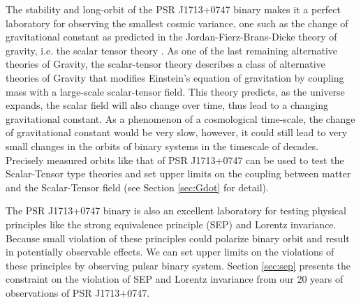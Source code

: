 The stability and long-orbit of the PSR J1713+0747 binary makes it a
perfect laboratory for observing the smallest cosmic variance, one such as the
change of gravitational constant as predicted in the Jordan-Fierz-Brans-Dicke
theory of gravity, i.e. the scalar tensor theory \citep{jor59,fie56,bd61}. 
As one of the last remaining alternative theories of Gravity, the scalar-tensor theory describes a class of alternative theories of Gravity
that modifies Einstein's equation of gravitation by coupling mass with a large-scale scalar-tensor field.
This theory predicts, as the universe expands, the scalar field will
also change over time, thus lead to a changing gravitational constant. 
As a phenomenon of a cosmological time-scale, the change of gravitational constant would be very slow, however, it could still lead to very small
changes in the orbits of binary systems in the timescale of decades. 
Precisely measured orbits like that of PSR J1713+0747 can be used to test the Scalar-Tensor type theories and set upper limits on the coupling between matter and the Scalar-Tensor field (see Section \ref{sec:Gdot} for detail). 

The PSR J1713+0747 binary is also an excellent laboratory for testing physical 
principles like the strong equivalence principle (SEP) and Lorentz invariance. 
Because small violation of these principles could polarize binary orbit and result in potentially observable effects. We can set upper limits on the violations of these principles by observing pulsar binary system. Section \ref{sec:sep} presents the constraint on the violation of SEP and Lorentz invariance from our 20 years of observations of PSR J1713+0747.

